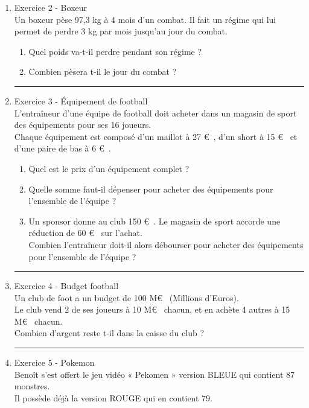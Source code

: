 \documentclass[11pt]{article}
\begin{document}
\begin{multicols}{2}
\begin{enumerate}
\begin{enumerate}
 

  \end{enumerate}
  \rule{\linewidth}{0.5pt}
\item[2] Exercice 2 - Boxeur\\
  Un boxeur pèse 97,3 kg à 4 mois d’un combat. Il fait un régime qui lui permet de perdre 3 kg par mois jusqu’au jour du combat.
  \begin{enumerate}
  \item Quel poids va-t-il perdre pendant son régime ?
  \item Combien pèsera t-il le jour du combat ?
  \end{enumerate}
\rule{\linewidth}{0.5pt}
\item[3] Exercice 3 - Équipement de football \\
  L’entraîneur d’une équipe de football doit acheter dans un magasin de sport des équipements pour ses 16 joueurs.\\
  Chaque équipement est composé d’un maillot à 27 \euro~, d’un short à 15 \euro~ et d’une paire de bas à 6 \euro~.\\
  \begin{enumerate}
  \item Quel est le prix d’un équipement complet ?
  \item Quelle somme faut-il dépenser pour acheter des équipements pour l’ensemble de l’équipe ?
  \item Un sponsor donne au club 150 \euro~. Le magasin de sport accorde une réduction de 60 \euro~ sur l’achat. \\
 Combien l’entraîneur doit-il alors débourser pour acheter des équipements pour l’ensemble de l’équipe ?
  \end{enumerate}
\rule{\linewidth}{0.5pt}
\item[4] Exercice 4 - Budget football\\
  Un club de foot a un budget de 100 M\euro~ (Millions d’Euros).\\
  Le club vend 2 de ses joueurs à 10 M\euro~ chacun, et en achète 4 autres à 15 M\euro~ chacun.\\
  Combien d’argent reste t-il dans la caisse du club ?\\
\rule{\linewidth}{0.5pt}
\item[5] Exercice 5 - Pokemon\\
  Benoît s’est offert le jeu vidéo « Pekomen » version BLEUE qui contient 87 monstres.\\
  Il possède déjà la version ROUGE qui en contient 79.
 \begin{enumerate}

\end{enumerate}
\end{enumerate}
\end{multicols}
\end{document}
